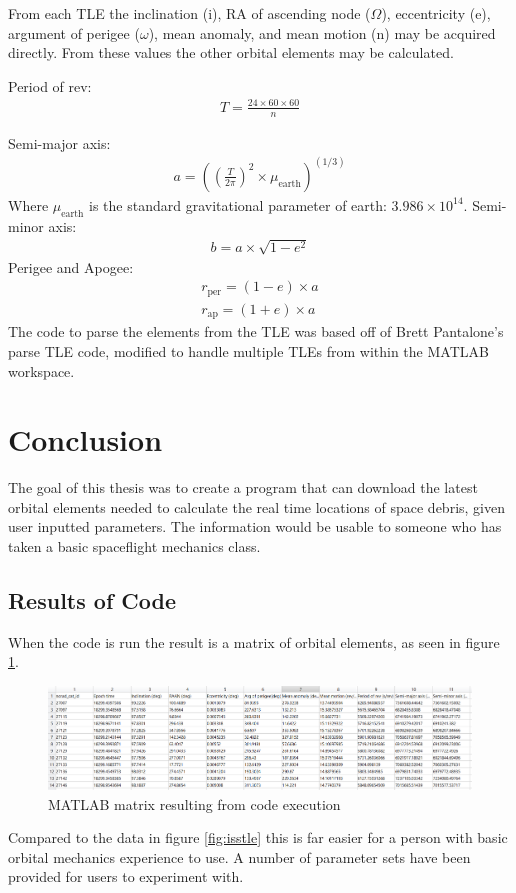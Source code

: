 \documentclass[12pt]{article}
\begin{document}
			
		
		From each TLE the inclination (i), RA of ascending node ($\Omega$), eccentricity (e), argument of perigee ($\omega$), mean anomaly, and mean motion (n) may be acquired directly. From these values the other orbital elements may be calculated. 
		
		Period of rev:
		\begin{align}
		T=\frac{24\times60\times60}{n}
		\end{align}
		
		Semi-major axis:
		\begin{align}
		a=\left(\left(\frac{T}{2\pi}\right)^2 \times \mu_\text{earth}\right)^{(1/3)}
		\end{align}
		Where $\mu_\text{earth}$ is the standard gravitational parameter of earth: $3.986\times10^{14}$. Semi-minor axis:
		\begin{align}
		b=a\times\sqrt{1-e^2}
		\end{align}
		Perigee and Apogee:
		\begin{align}
		r_\text{per}=\left(1-e\right)\times a\\
		r_\text{ap}=\left(1+e\right)\times a
		\end{align}
		The code to parse the elements from the TLE was based off of Brett Pantalone's parse TLE code\cite{codeParseTLE}, modified to handle multiple TLEs from within the MATLAB workspace. 
		
		
	
	\section{Conclusion}
	The goal of this thesis was to create a program that can download the latest orbital elements needed to calculate the real time locations of space debris, given user inputted parameters. The information would be usable to someone who has taken a basic spaceflight mechanics class. 
	
	\subsection{Results of Code}
	When the code is run the result is a matrix of orbital elements, as seen in figure \ref{fig:matlaboutput}. 
	
	
	\begin{figure}[H]
		\centering
		\includegraphics[width=0.7\linewidth]{MATLAB_output}
		\caption{MATLAB matrix resulting from code execution}
		\label{fig:matlaboutput}
	\end{figure}
	Compared to the data in figure \ref{fig:isstle} this is far easier for a person with basic orbital mechanics experience to use. A number of parameter sets have been provided for users to experiment with. 
\end{document}
